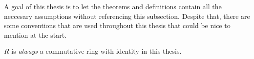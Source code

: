 A goal of this thesis is to let the theorems and definitions contain all the neccesary assumptions without referencing this subsection. Despite that, there are some conventions that are used throughout this thesis that could be nice to mention at the start.

\begin{notation}
    \( R \) is \emph{always} a commutative ring with identity in this thesis.
\end{notation}
